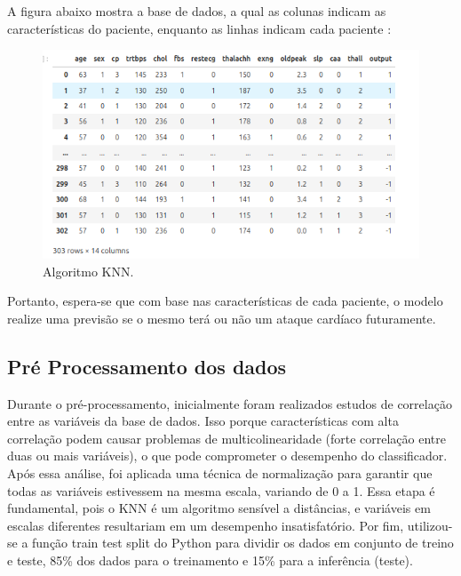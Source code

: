 \documentclass{article} %
\begin{document}
\vspace{1cm}

A figura abaixo mostra a base de dados, a qual as colunas indicam as características do paciente, enquanto as linhas indicam cada paciente : 

\vspace{1cm}

\begin{figure}[h] %
    \centering %
    \includegraphics[width=1\linewidth]{dataset.png} %
    \caption{Algoritmo KNN.} %
    \label{fig:exemplo} %
\end{figure}

\vspace{1cm}

Portanto, espera-se que com base nas características de cada paciente, o modelo realize uma previsão se o mesmo terá ou não um ataque cardíaco futuramente.

\newpage

\subsection{Pré Processamento dos dados}

Durante o pré-processamento, inicialmente foram realizados estudos de correlação entre as variáveis da base de dados. Isso porque características com alta correlação podem causar problemas de multicolinearidade (forte correlação entre duas ou mais variáveis), o que pode comprometer o desempenho do classificador. Após essa análise, foi aplicada uma técnica de normalização para garantir que todas as variáveis estivessem na mesma escala, variando de 0 a 1. Essa etapa é fundamental, pois o KNN é um algoritmo sensível a distâncias, e variáveis em escalas diferentes resultariam em um desempenho insatisfatório. Por fim, utilizou-se a função train test split do Python para dividir os dados em conjunto de treino e teste, 85\% dos dados para o treinamento e 15\% para a inferência (teste).
\end{document}
